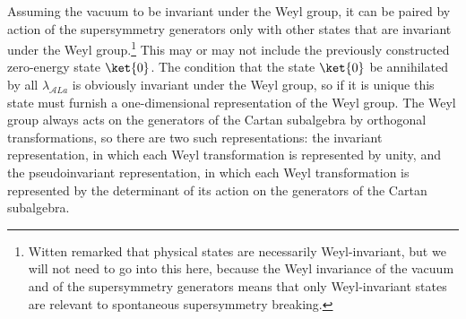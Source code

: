 Assuming the vacuum to be invariant under the Weyl group, it can be paired
by action of the supersymmetry generators only with other states that are
invariant under the Weyl group.\footnote{Witten remarked that physical
states are necessarily Weyl-invariant, but we will not need to go into this
here, because the Weyl invariance of the vacuum and of the supersymmetry
generators means that only Weyl-invariant states are relevant to spontaneous
supersymmetry breaking.} This may or may not include the previously
constructed zero-energy state \(\ket{0}\). The condition that the state
\(\ket{0}\) be annihilated by all \(\lambda_{\mathcal A La}\) is obviously
invariant under the Weyl group, so if it is unique this state must furnish a
one-dimensional representation of the Weyl group. The Weyl group always
acts on the generators of the Cartan subalgebra by orthogonal
transformations, so there are two such representations: the invariant
representation, in which each Weyl transformation is represented by unity,
and the pseudoinvariant representation, in which each Weyl transformation
is represented by the determinant of its action on the generators of the
Cartan subalgebra.

